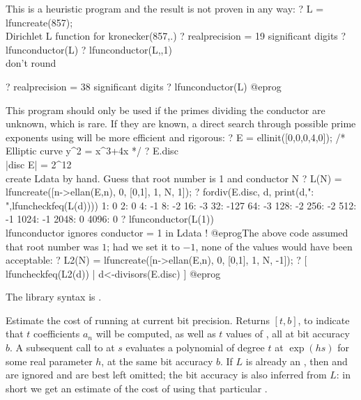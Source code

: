   This is a heuristic program and the result is not
 proven in any way:
 \bprog
 ? L = lfuncreate(857); \\ Dirichlet L function for kronecker(857,.)
 ? 
   realprecision = 19 significant digits
 ? lfunconductor(L)
 ? lfunconductor(L,,1) \\ don't round

 ? 
   realprecision = 38 significant digits
 ? lfunconductor(L)
 @eprog

  This program should only be used if the primes dividing the
 conductor are unknown, which is rare. If they are known, a direct
 search through possible prime exponents using  will
 be more efficient and rigorous:
 \bprog
 ? E = ellinit([0,0,0,4,0]); /* Elliptic curve y^2 = x^3+4x */
 ? E.disc  \\ |disc E| = 2^12
 \\ create Ldata by hand. Guess that root number is 1 and conductor N
 ? L(N) = lfuncreate([n->ellan(E,n), 0, [0,1], 1, N, 1]);
 ? fordiv(E.disc, d, print(d,": ",lfuncheckfeq(L(d))))
 1: 0
 2: 0
 4: -1
 8: -2
 16: -3
 32: -127
 64: -3
 128: -2
 256: -2
 512: -1
 1024: -1
 2048: 0
 4096: 0
 ? lfunconductor(L(1)) \\ lfunconductor ignores conductor = 1 in Ldata !
 @eprog\noindent The above code assumed that root number was $1$;
 had we set it to $-1$, none of the  values would have been
 acceptable:
 \bprog
 ? L2(N) = lfuncreate([n->ellan(E,n), 0, [0,1], 1, N, -1]);
 ? [ lfuncheckfeq(L2(d)) | d<-divisors(E.disc) ]
 @eprog

The library syntax is \fun{GEN}{lfunconductor}{GEN L, GEN ab = NULL, long 10000], long bitprec}.

\label{se:lfuncost}
Estimate the cost of running
 at current bit precision. Returns $[t,b]$, to
indicate that $t$ coefficients $a_n$ will be computed, as well as $t$ values of
, all at bit accuracy $b$.
A subsequent call to  at $s$ evaluates a polynomial of degree $t$
at $\exp(h s)$ for some real parameter $h$, at the same bit accuracy $b$.
If $L$ is already an , then  and  are ignored
and are best left omitted; the bit accuracy is also inferred from $L$: in
short we get an estimate of the cost of using that particular .


